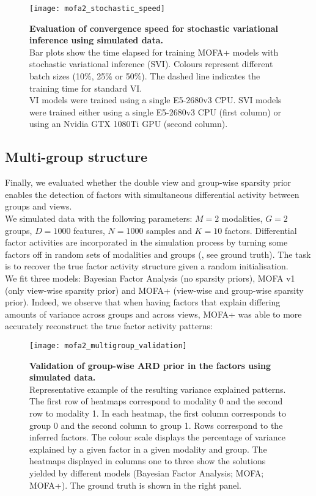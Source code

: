 \begin{figure}[H]
	\centering
	\texttt{[image: mofa2\_stochastic\_speed]}
	\caption[]{
	\textbf{Evaluation of convergence speed for stochastic variational inference using simulated data.} \\
	Bar plots show the time elapsed for training MOFA+ models with  stochastic variational inference (SVI). Colours represent different batch sizes (10\%, 25\% or 50\%). The dashed line indicates the training time for standard VI.\\
	VI models were trained using a single E5-2680v3 CPU. SVI models were trained either using a single E5-2680v3 CPU (first column) or using an Nvidia GTX 1080Ti GPU (second column). 
	}
	\label{fig:mofa2_stochastic_speed}
\end{figure}



\subsection{Multi-group structure}

Finally, we evaluated whether the double view and group-wise sparsity prior enables the detection of factors with simultaneous differential activity between groups and views.\\
We simulated data with the following parameters: $M=2$ modalities, $G=2$ groups, $D=1000$ features, $N=1000$ samples and $K=10$ factors. Differential factor activities are incorporated in the simulation process by turning some factors off in random sets of modalities and groups (, see ground truth). The task is to recover the true factor activity structure given a random initialisation.\\
We fit three models: Bayesian Factor Analysis (no sparsity priors), MOFA v1 (only view-wise sparsity prior) and MOFA+ (view-wise and group-wise sparsity prior). 
Indeed, we observe that when having factors that explain differing amounts of variance across groups and across views, MOFA+ was able to more accurately reconstruct the true factor activity patterns:

\begin{figure}[H]
	\centering
	\texttt{[image: mofa2\_multigroup\_validation]}
	\caption[]{
	\textbf{Validation of group-wise ARD prior in the factors using simulated data.} \\
	Representative example of the resulting variance explained patterns. The first row of heatmaps correspond to modality 0 and the second row to modality 1. In each heatmap, the first column corresponds to group 0 and the second column to group 1. Rows correspond to the inferred factors. The colour scale displays the percentage of variance explained by a given factor in a given modality and group. The heatmaps displayed in columns one to three show the solutions yielded by different models (Bayesian Factor Analysis; MOFA; MOFA+). The ground truth is shown in the right panel. 
	}
	\label{fig:mofa2_multigroup_validation}
\end{figure}




